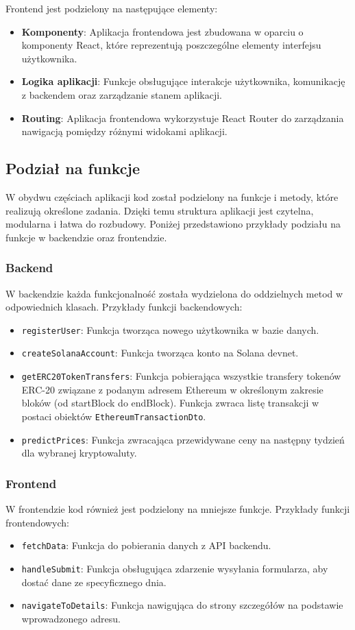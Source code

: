 Frontend jest podzielony na następujące elementy:
\begin{itemize}
    \item \textbf{Komponenty}: Aplikacja frontendowa jest zbudowana w oparciu o komponenty React, które reprezentują poszczególne elementy interfejsu użytkownika.
    \item \textbf{Logika aplikacji}: Funkcje obsługujące interakcje użytkownika, komunikację z backendem oraz zarządzanie stanem aplikacji.
    \item \textbf{Routing}: Aplikacja frontendowa wykorzystuje React Router do zarządzania nawigacją pomiędzy różnymi widokami aplikacji.
\end{itemize}

\subsection{Podział na funkcje}

W obydwu częściach aplikacji kod został podzielony na funkcje i metody, które realizują określone zadania. Dzięki temu struktura aplikacji jest czytelna, modularna i łatwa do rozbudowy. Poniżej przedstawiono przykłady podziału na funkcje w backendzie oraz frontendzie.

\subsubsection{Backend}
W backendzie każda funkcjonalność została wydzielona do oddzielnych metod w odpowiednich klasach. Przykłady funkcji backendowych:
\begin{itemize}
    \item \texttt{registerUser}: Funkcja tworząca nowego użytkownika w bazie danych.
    \item \texttt{createSolanaAccount}: Funkcja tworząca konto na Solana devnet.
    \item \texttt{getERC20TokenTransfers}: Funkcja pobierająca wszystkie transfery tokenów ERC-20 związane z podanym adresem Ethereum w określonym zakresie bloków (od startBlock do endBlock). Funkcja zwraca listę transakcji w postaci obiektów \texttt{EthereumTransactionDto}.
		\item \texttt{predictPrices}: Funkcja zwracająca przewidywane ceny na następny tydzień dla wybranej kryptowaluty.
\end{itemize}

\subsubsection{Frontend}
W frontendzie kod również jest podzielony na mniejsze funkcje. Przykłady funkcji frontendowych:
\begin{itemize}
    \item \texttt{fetchData}: Funkcja do pobierania danych z API backendu.
    \item \texttt{handleSubmit}: Funkcja obsługująca zdarzenie wysyłania formularza, aby dostać dane ze specyficznego dnia.
    \item \texttt{navigateToDetails}: Funkcja nawigująca do strony szczegółów na podstawie wprowadzonego adresu.
\end{itemize}

